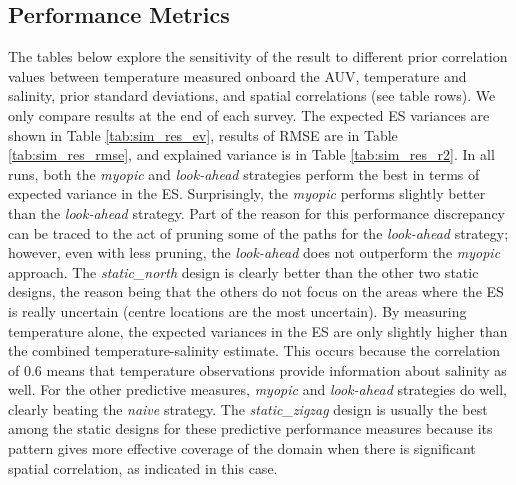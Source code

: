 \documentclass[aoas]{imsart}
\begin{document}
\subsection{Performance Metrics}
The tables below explore the sensitivity of the result to different prior correlation values between temperature measured onboard the AUV, temperature and salinity, prior standard deviations, and spatial correlations (see table rows). We only compare results at the end of each survey. The expected ES variances are shown in Table \ref{tab:sim_res_ev}, results of RMSE are in Table \ref{tab:sim_res_rmse}, and explained variance is in Table \ref{tab:sim_res_r2}. In all runs, both the \textit{myopic} and \textit{look-ahead} strategies perform the best in terms of expected variance in the ES. Surprisingly, the \textit{myopic} performs slightly better than the \textit{look-ahead} strategy. Part of the reason for this performance discrepancy can be traced to the act of pruning some of the paths for the \textit{look-ahead} strategy; however, even with less pruning, the \textit{look-ahead} does not outperform the \textit{myopic} approach. The \textit{static\_north} design is clearly better than the other two static designs, the reason being that the others do not focus on the areas where the ES is really uncertain (centre locations are the most uncertain). By measuring temperature alone, the expected variances in the ES are only slightly higher than the combined temperature-salinity estimate. This occurs because the correlation of $0.6$ means that temperature observations provide information about salinity as well. For the other predictive measures, \textit{myopic} and \textit{look-ahead} strategies do well, clearly beating the \textit{naive} strategy. The \textit{static\_zigzag} design is usually the best among the static designs for these predictive performance measures because its pattern gives more effective coverage of the domain when there is significant spatial correlation, as indicated in this case.
\end{document}
